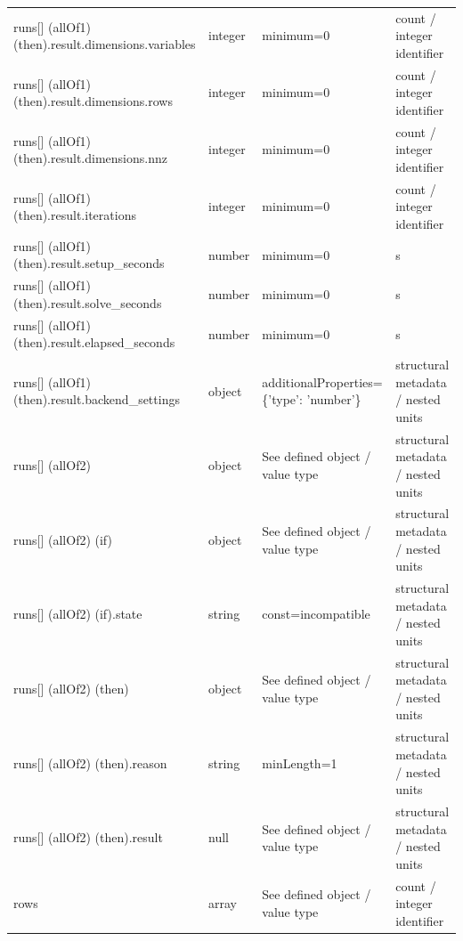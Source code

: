 \begin{longtable}{@{}>{\raggedright\arraybackslash}p{}>{\raggedright\arraybackslash}p{}>{\raggedright\arraybackslash}p{}>{\raggedright\arraybackslash}p{}@{}}
runs[] (allOf1) (then).\allowbreak{}result.\allowbreak{}dimensions.\allowbreak{}variables & integer & minimum=\allowbreak{}0 & count /\allowbreak{} integer identifier\\
runs[] (allOf1) (then).\allowbreak{}result.\allowbreak{}dimensions.\allowbreak{}rows & integer & minimum=\allowbreak{}0 & count /\allowbreak{} integer identifier\\
runs[] (allOf1) (then).\allowbreak{}result.\allowbreak{}dimensions.\allowbreak{}nnz & integer & minimum=\allowbreak{}0 & count /\allowbreak{} integer identifier\\
runs[] (allOf1) (then).\allowbreak{}result.\allowbreak{}iterations & integer & minimum=\allowbreak{}0 & count /\allowbreak{} integer identifier\\
runs[] (allOf1) (then).\allowbreak{}result.\allowbreak{}setup\_\allowbreak{}seconds & number & minimum=\allowbreak{}0 & s\\
runs[] (allOf1) (then).\allowbreak{}result.\allowbreak{}solve\_\allowbreak{}seconds & number & minimum=\allowbreak{}0 & s\\
runs[] (allOf1) (then).\allowbreak{}result.\allowbreak{}elapsed\_\allowbreak{}seconds & number & minimum=\allowbreak{}0 & s\\
runs[] (allOf1) (then).\allowbreak{}result.\allowbreak{}backend\_\allowbreak{}settings & object & additionalProperties=\allowbreak{}\{'type': 'number'\} & structural metadata /\allowbreak{} nested units\\
runs[] (allOf2) & object & See defined object /\allowbreak{} value type & structural metadata /\allowbreak{} nested units\\
runs[] (allOf2) (if) & object & See defined object /\allowbreak{} value type & structural metadata /\allowbreak{} nested units\\
runs[] (allOf2) (if).\allowbreak{}state & string & const=\allowbreak{}incompatible & structural metadata /\allowbreak{} nested units\\
runs[] (allOf2) (then) & object & See defined object /\allowbreak{} value type & structural metadata /\allowbreak{} nested units\\
runs[] (allOf2) (then).\allowbreak{}reason & string & minLength=\allowbreak{}1 & structural metadata /\allowbreak{} nested units\\
runs[] (allOf2) (then).\allowbreak{}result & null & See defined object /\allowbreak{} value type & structural metadata /\allowbreak{} nested units\\
rows & array & See defined object /\allowbreak{} value type & count /\allowbreak{} integer identifier\\

\end{longtable}
